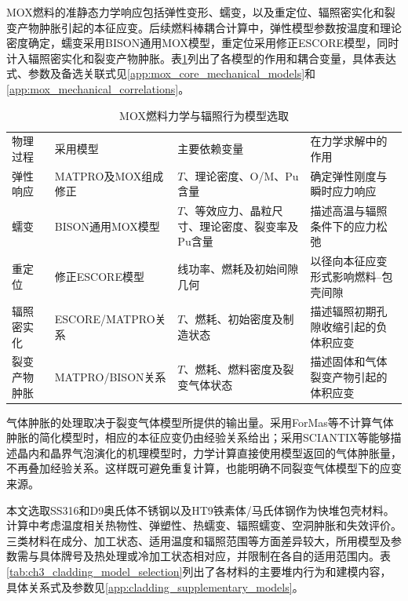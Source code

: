 MOX燃料的准静态力学响应包括弹性变形、蠕变，以及重定位、辐照密实化和裂变产物肿胀引起的本征应变。后续燃料棒耦合计算中，弹性模型参数按温度和理论密度确定，蠕变采用BISON通用MOX模型，重定位采用修正ESCORE模型，同时计入辐照密实化和裂变产物肿胀。表\ref{tab:ch3_mox_mechanical_selection}列出了各模型的作用和耦合变量，具体表达式、参数及备选关联式见\ref{app:mox_core_mechanical_models}和\ref{app:mox_mechanical_correlations}。

\begin{table}[htbp]
	\centering
	\caption{MOX燃料力学与辐照行为模型选取}
	\label{tab:ch3_mox_mechanical_selection}
	\begin{tabularx}{\textwidth}{@{}
			>{\centering\arraybackslash}m{2.4cm}
			>{\centering\arraybackslash}m{3.3cm}
			>{\centering\arraybackslash}X
			>{\centering\arraybackslash}X
			@{}}
		\toprule
		物理过程 & 采用模型 & 主要依赖变量 & 在力学求解中的作用 \\
		弹性响应 & MATPRO及MOX组成修正 & $T$、理论密度、O/M、Pu含量 & 确定弹性刚度与瞬时应力响应 \\
		蠕变 & BISON通用MOX模型\cite{halesBISONTheoryManual2016,MiletJNM1983} & $T$、等效应力、晶粒尺寸、理论密度、裂变率及Pu含量 & 描述高温与辐照条件下的应力松弛 \\
		重定位 & 修正ESCORE模型\cite{fancherESCOREEPRISteadystate1987,halesBISONTheoryManual2016} & 线功率、燃耗及初始间隙几何 & 以径向本征应变形式影响燃料--包壳间隙 \\
		辐照密实化 & ESCORE/MATPRO关系 & $T$、燃耗、初始密度及制造状态 & 描述辐照初期孔隙收缩引起的负体积应变 \\
		裂变产物肿胀 & MATPRO/BISON关系 & $T$、燃耗、燃料密度及裂变气体状态 & 描述固体和气体裂变产物引起的体积应变 \\
		\bottomrule
	\end{tabularx}
\end{table}

气体肿胀的处理取决于裂变气体模型所提供的输出量。采用ForMas等不计算气体肿胀的简化模型时，相应的本征应变仍由经验关系给出；采用SCIANTIX等能够描述晶内和晶界气泡演化的机理模型时，力学计算直接使用模型返回的气体肿胀量，不再叠加经验关系。这样既可避免重复计算，也能明确不同裂变气体模型下的应变来源。

\label{sec:cladding_incore_models}

本文选取SS316和D9奥氏体不锈钢以及HT9铁素体/马氏体钢作为快堆包壳材料。计算中考虑温度相关热物性、弹塑性、热蠕变、辐照蠕变、空洞肿胀和失效评价。三类材料在成分、加工状态、适用温度和辐照范围等方面差异较大，所用模型及参数需与具体牌号及热处理或冷加工状态相对应，并限制在各自的适用范围内。表\ref{tab:ch3_cladding_model_selection}列出了各材料的主要堆内行为和建模内容，具体关系式及参数见\ref{app:cladding_supplementary_models}。

